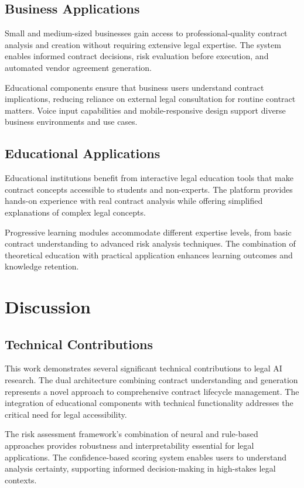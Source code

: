 \documentclass[conference]{IEEEtran}
\begin{document}
\subsection{Business Applications}

Small and medium-sized businesses gain access to professional-quality contract analysis and creation without requiring extensive legal expertise. The system enables informed contract decisions, risk evaluation before execution, and automated vendor agreement generation.

Educational components ensure that business users understand contract implications, reducing reliance on external legal consultation for routine contract matters. Voice input capabilities and mobile-responsive design support diverse business environments and use cases.

\subsection{Educational Applications}

Educational institutions benefit from interactive legal education tools that make contract concepts accessible to students and non-experts. The platform provides hands-on experience with real contract analysis while offering simplified explanations of complex legal concepts.

Progressive learning modules accommodate different expertise levels, from basic contract understanding to advanced risk analysis techniques. The combination of theoretical education with practical application enhances learning outcomes and knowledge retention.

\section{Discussion}

\subsection{Technical Contributions}

This work demonstrates several significant technical contributions to legal AI research. The dual architecture combining contract understanding and generation represents a novel approach to comprehensive contract lifecycle management. The integration of educational components with technical functionality addresses the critical need for legal accessibility.

The risk assessment framework's combination of neural and rule-based approaches provides robustness and interpretability essential for legal applications. The confidence-based scoring system enables users to understand analysis certainty, supporting informed decision-making in high-stakes legal contexts.
\end{document}
